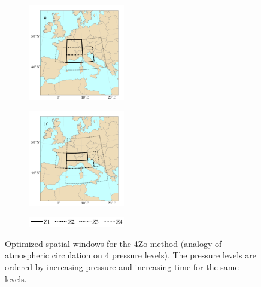 \documentclass[5p]{elsarticle}
\begin{document}
\begin{figure}[htb]
\begin{subfigure}{.5\columnwidth}
	\end{subfigure}
	\begin{subfigure}{.5\columnwidth}
		\centering
		\includegraphics[width=4.2cm]{figures/spatial_win_z4/Spatial_windows_9.png}
	\end{subfigure}%
	\begin{subfigure}{.5\columnwidth}
		\centering
		\includegraphics[width=4.2cm]{figures/spatial_win_z4/Spatial_windows_10.png}
	\end{subfigure}
	\begin{subfigure}{.5\columnwidth}
		\centering
		\includegraphics[width=4.2cm]{figures/spatial_win_z4/legend.png}
	\end{subfigure}
	\caption{Optimized spatial windows for the 4Zo method (analogy of atmospheric circulation on 4 pressure levels). The pressure levels are ordered by increasing pressure and increasing time for the same levels.}
	\label{fig:spatial_windows_4Zo}
\end{figure}
\end{document}
